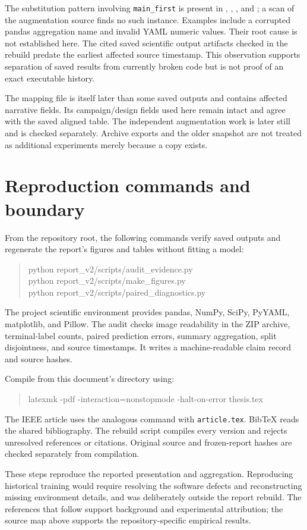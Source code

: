 The substitution pattern involving \texttt{main\_first} is present in , , , and ; a scan of the augmentation source finds no such instance. Examples include a corrupted pandas aggregation name and invalid YAML numeric values. Their root cause is not established here. The cited saved scientific output artifacts checked in the rebuild predate the earliest affected source timestamp. This observation supports separation of saved results from currently broken code but is not proof of an exact executable history.

The mapping file is itself later than some saved outputs and contains affected narrative fields. Its campaign/design fields used here remain intact and agree with the saved aligned table. The independent augmentation work is later still and is checked separately. Archive exports and the older snapshot are not treated as additional experiments merely because a copy exists.

\section{Reproduction commands and boundary}
From the repository root, the following commands verify saved outputs and regenerate the report's figures and tables without fitting a model:
\begin{quote}\small\ttfamily
python report\_v2/scripts/audit\_evidence.py\\
python report\_v2/scripts/make\_figures.py\\
python report\_v2/scripts/paired\_diagnostics.py
\end{quote}
The project scientific environment provides pandas, NumPy, SciPy, PyYAML, matplotlib, and Pillow. The audit checks image readability in the ZIP archive, terminal-label counts, paired prediction errors, summary aggregation, split disjointness, and source timestamps. It writes a machine-readable claim record and source hashes.

Compile from this document's directory using:
\begin{quote}\small\ttfamily
latexmk -pdf -interaction=nonstopmode -halt-on-error thesis.tex
\end{quote}
The IEEE article uses the analogous command with \texttt{article.tex}. BibTeX reads the shared bibliography. The rebuild script compiles every version and rejects unresolved references or citations. Original source and frozen-report hashes are checked separately from compilation.

These steps reproduce the reported presentation and aggregation. Reproducing historical training would require resolving the software defects and reconstructing missing environment details, and was deliberately outside the report rebuild. The references that follow support background and experimental attribution; the source map above supports the repository-specific empirical results.
